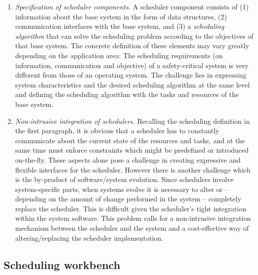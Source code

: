 	\begin{enumerate}
	\item \emph{Specification of scheduler components.} A scheduler component consists of (1) information about the base system in the
	form of data structures, (2) communication interfaces with the base system, and (3) a \emph{scheduling
	algorithm} that can solve the scheduling problem according to the objectives of that base system.
	The concrete definition of these elements may vary greatly depending on the
	application area: The scheduling requirements (on information, communication and objective) of a safety-critical system is
	very different from those of an operating system. The challenge lies in
	expressing system characteristics and the desired scheduling algorithm at the
	same level and defining the scheduling algorithm with the tasks and resources of
	the base system.
	
	\item \emph{Non-intrusive integration of schedulers.} Recalling the scheduling definition in the first paragraph, it is obvious that a
	scheduler has to constantly communicate about the current state of the
	resources and tasks, and at the same
	time must enforce constraints which might be predefined or introduced
	on-the-fly. These aspects alone pose a challenge in creating expressive and
	flexible interfaces for the scheduler. However there is another challenge which
	is the by-product of software/system evolution. Since schedulers involve system-specific parts, when systems evolve it is necessary to alter or -- depending on
	the amount of change performed in the system -- completely replace the scheduler.
	This is difficult given the scheduler's tight integration within the system
	software.
	This problem calls for a non-intrusive integration mechanism between the
	scheduler and the system and a cost-effective way of altering/replacing the
	scheduler implementation.
	\end{enumerate}
	
	\subsection{Scheduling workbench}
	\label{sect:approach}
	
